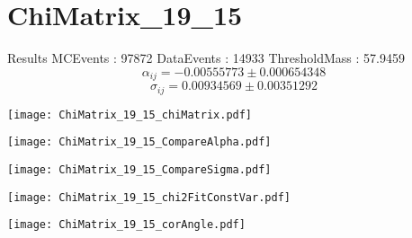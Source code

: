 \documentclass[a4paper,12pt]{article}
\begin{document}
\section{ChiMatrix\_19\_15}
\begin{minipage}{0.49\linewidth} Results \newline
MCEvents : 97872\newline
DataEvents : 14933 \newline
ThresholdMass : 57.9459\\
$$\alpha_{ij} = -0.00555773\pm 0.000654348$$
$$\sigma_{ij} = 0.00934569\pm 0.00351292$$
\end{minipage}\hfill
\begin{minipage}{0.49\linewidth} 
\texttt{[image: ChiMatrix\_19\_15\_chiMatrix.pdf]}\\
\end{minipage}
\hfill
\begin{minipage}{0.49\linewidth} 
\texttt{[image: ChiMatrix\_19\_15\_CompareAlpha.pdf]}\\
\end{minipage}
\hfill
\begin{minipage}{0.49\linewidth} 
\texttt{[image: ChiMatrix\_19\_15\_CompareSigma.pdf]}\\
\end{minipage}
\begin{minipage}{0.49\linewidth} 
\texttt{[image: ChiMatrix\_19\_15\_chi2FitConstVar.pdf]}\\
\end{minipage}
\hfill
\begin{minipage}{0.49\linewidth} 
\texttt{[image: ChiMatrix\_19\_15\_corAngle.pdf]}\\
\end{minipage}
\end{document}

